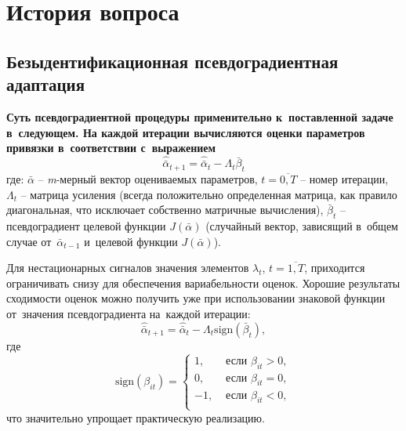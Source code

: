 \chapter{История вопроса}
\section{Безыдентификационная псевдоградиентная адаптация}
\textbf{Суть псевдоградиентной процедуры применительно к~поставленной задаче в~следующем. На каждой итерации вычисляются оценки параметров привязки в~соответствии с~выражением}
\[
\hat{\bar{\alpha}}_{t+1}=\hat{\bar{\alpha}}_{t}-\Lambda_{t}\bar{\beta}_{t}
\]
где: $\bar{\alpha}$ -- \textit{m}-мерный вектор оцениваемых параметров, $t=\overline{0,T}$ -- номер итерации, $\Lambda_{t}$ -- матрица усиления (всегда положительно определенная матрица, как правило диагональная, что исключает собственно матричные вычисления), $\bar{\beta}_{t}$ -- псевдоградиент целевой функции $J(\bar{\alpha})$ (случайный вектор, зависящий в~общем случае от~$\bar{\alpha}_{t-1}$ и~целевой функции $J(\bar{\alpha})$).

Для нестационарных сигналов значения элементов $\lambda_{t}$, $t=\overline{1,T}$, приходится ограничивать снизу для обеспечения вариабельности оценок. Хорошие результаты сходимости оценок можно получить уже при использовании знаковой функции от~значения псевдоградиента на~каждой итерации:
\[
\hat{\bar{\alpha}}_{t+1}=\hat{\bar{\alpha}}_{t}-\Lambda_{t}\text{sign}(\bar{\beta}_{t}),
\]
где
\[
\text{sign}(\beta_{it})= 
\left\{
	\begin{aligned}
		1, &\text{ если } \beta_{it} > 0, \\
		0, &\text{ если } \beta_{it} = 0, \\
		-1, &\text{ если } \beta_{it} < 0, \\
	\end{aligned}
\right.
\]
что значительно упрощает практическую реализацию. 